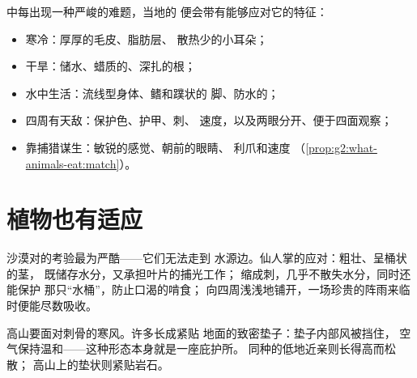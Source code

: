 \begin{proposition}[适应应对难题]\label{prop:g4:adapted-to-their-world:answers}
中每出现一种严峻的难题，当地的
便会带有能够应对它的特征：
\begin{itemize}
  \item 寒冷：厚厚的毛皮、脂肪层、
        散热少的小耳朵；
  \item 干旱：储水、蜡质的、深扎的根；
  \item 水中生活：流线型身体、鳍和蹼状的
        脚、防水的；
  \item 四周有天敌：保护色、护甲、刺、
        速度，以及两眼分开、便于四面观察；
  \item 靠捕猎谋生：敏锐的感觉、朝前的眼睛、
        利爪和速度
        （\cref{prop:g2:what-animals-eat:match}）。
\end{itemize}
\end{proposition}
\admitted

\section{植物也有适应}

\begin{example}[仙人掌]\label{ex:g4:adapted-to-their-world:cactus}
沙漠对的考验最为严酷——它们无法走到
水源边。仙人掌的应对：粗壮、呈桶状的茎，
既储存水分，又承担叶片的捕光工作；
缩成刺，几乎不散失水分，同时还能保护
那只“水桶”，防止口渴的啃食；
向四周浅浅地铺开，一场珍贵的阵雨来临时便能尽数吸收。
\end{example}

\begin{example}[高山垫状植物]\label{ex:g4:adapted-to-their-world:alpine}
高山要面对刺骨的寒风。许多长成紧贴
地面的致密垫子：垫子内部风被挡住，
空气保持温和——这种形态本身就是一座庇护所。
同种的低地近亲则长得高而松散；
高山上的垫状则紧贴岩石。
\end{example}

